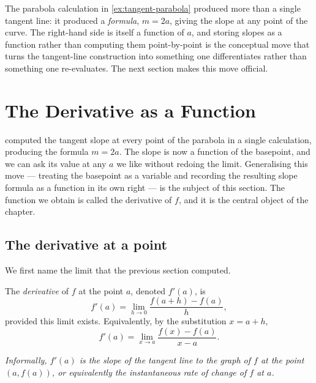 The parabola calculation in \cref{ex:tangent-parabola} produced more than a single tangent line: it produced a \emph{formula}, \(m = 2a\), giving the slope at any point of the curve. The right-hand side is itself a function of \(a\), and storing slopes as a function rather than computing them point-by-point is the conceptual move that turns the tangent-line construction into something one differentiates rather than something one re-evaluates. The next section makes this move official.

\section{The Derivative as a Function}\label{sec:derivative-as-function}

 computed the tangent slope at every point of the parabola in a single calculation, producing the formula \(m = 2a\). The slope is now a function of the basepoint, and we can ask its value at any \(a\) we like without redoing the limit. Generalising this move --- treating the basepoint as a variable and recording the resulting slope formula as a function in its own right --- is the subject of this section. The function we obtain is called the derivative of \(f\), and it is the central object of the chapter.

\subsection{The derivative at a point}

We first name the limit that the previous section computed.

\begin{definition}\label{def:derivative-at-a}
The \emph{derivative} of \(f\) at the point \(a\), denoted \(f'(a)\), is
\[
f'(a) = \lim_{h \to 0} \frac{f(a + h) - f(a)}{h},
\]
provided this limit exists. Equivalently, by the substitution \(x = a + h\),
\[
f'(a) = \lim_{x \to a} \frac{f(x) - f(a)}{x - a}.
\]

\emph{Informally, \(f'(a)\) is the slope of the tangent line to the graph of \(f\) at the point \((a, f(a))\), or equivalently the instantaneous rate of change of \(f\) at \(a\).}
\end{definition}

